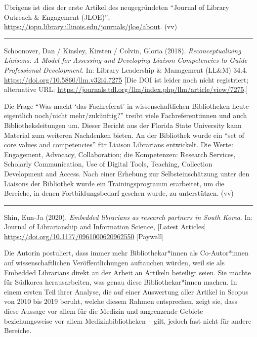 \documentclass[a4paper,
fontsize=11pt,
oneside,
numbers=noperiodatend,
parskip=half-,
bibliography=totoc,
final
]{scrartcl}
\begin{document}
Übrigens ist dies der erste Artikel des neugegründeten \enquote{Journal
of Library Outreach \& Engagement (JLOE)},
\url{https://iopn.library.illinois.edu/journals/jloe/about}. (vv)

\begin{center}\rule{0.5\linewidth}{0.5pt}\end{center}

Schoonover, Dan / Kinsley, Kirsten / Colvin, Gloria (2018).
\emph{Reconceptualizing Liaisons: A Model for Assessing and Developing
Liaison Competencies to Guide Professional Development}. In: Library
Leadership \& Management (LL\&M) 34.4.
\url{https://doi.org/10.5860/llm.v32i4.7275} {[}Die DOI ist leider noch
nicht registriert; alternative URL:
\url{https://journals.tdl.org/llm/index.php/llm/article/view/7275}.{]}

Die Frage \enquote{Was macht \enquote*{das Fachreferat} in
wissenschaftlichen Bibliotheken heute eigentlich noch/nicht
mehr/zukünftig?} treibt viele Fachreferent:innen und auch
Bibliotheksleitungen um. Dieser Bericht aus der Florida State University
kann Material zum weiteren Nachdenken bieten. An der Bibliothek wurde
ein \enquote{set of core values and competencies} für Liaison Librarians
entwickelt. Die Werte: Engagement, Advocacy, Collaboration; die
Kompetenzen: Research Services, Scholarly Communication, Use of Digital
Tools, Teaching, Collection Development and Access. Nach einer Erhebung
zur Selbsteinschätzung unter den Liaisons der Bibliothek wurde ein
Trainingsprogramm erarbeitet, um die Bereiche, in denen
Fortbildungsbedarf gesehen wurde, zu unterstützen. (vv)

\begin{center}\rule{0.5\linewidth}{0.5pt}\end{center}

Shin, Eun-Ja (2020). \emph{Embedded librarians as research partners in
South Korea}. In: Journal of Librarianship and Information Science,
{[}Latest Articles{]} \url{https://doi.org/10.1177/0961000620962550}
{[}Paywall{]}

Die Autorin postuliert, dass immer mehr Bibliothekar*innen als
Co-Autor*innen auf wissenschaftlichen Veröffentlichungen auftauchen
würden, weil sie als Embedded Librarians direkt an der Arbeit an
Artikeln beteiligt seien. Sie möchte für Südkorea herausarbeiten, was
genau diese Bibliothekar*innen machen. In einem ersten Teil ihrer
Analyse, die auf einer Auswertung aller Artikel in Scopus von 2010 bis
2019 beruht, welche diesem Rahmen entsprechen, zeigt sie, dass diese
Aussage vor allem für die Medizin und angrenzende Gebiete --
beziehungsweise vor allem Medizinbibliotheken -- gilt, jedoch fast nicht
für andere Bereiche.
\end{document}
